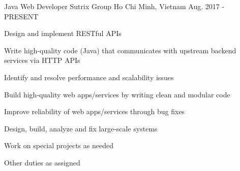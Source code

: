

\begin{cventries}

  \cventry
    {Java Web Developer} %
    {Sutrix Group} %
    {Ho Chi Minh, Vietnam} %
    {Aug. 2017 - PRESENT} %
    {
      \begin{cvitems} %
        \item {Design and implement RESTful APIs}
        \item {Write high-quality code (Java) that communicates with upstream backend services via HTTP APIs}
        \item {Identify and resolve performance and scalability issues}
        \item {Build high-quality web apps/services by writing clean and modular code}
        \item {Improve reliability of web apps/services through bug fixes}
        \item {Design, build, analyze and fix large-scale systems}
        \item {Work on special projects as needed}
        \item {Other duties as assigned}
      \end{cvitems}
    }


\end{cventries}
